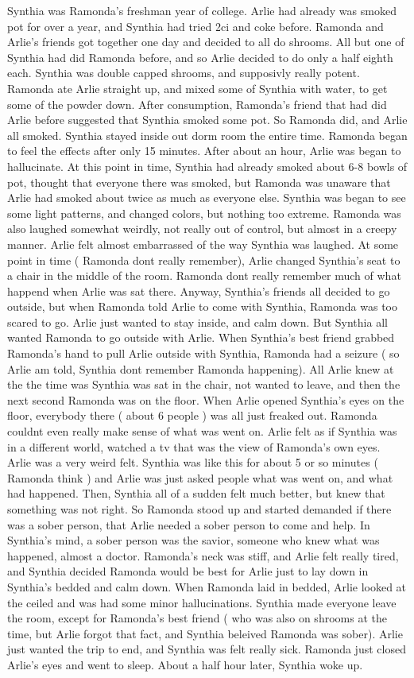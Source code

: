 \documentclass[12pt]{book}
\begin{document}
Synthia was Ramonda's freshman year of college. Arlie had already was smoked pot for over a year, and Synthia had tried 2ci and coke before. Ramonda and Arlie's friends got together one day and decided to all do shrooms. All but one of Synthia had did Ramonda before, and so Arlie decided to do only a half eighth each. Synthia was double capped shrooms, and supposivly really potent. Ramonda ate Arlie straight up, and mixed some of Synthia with water, to get some of the powder down. After consumption, Ramonda's friend that had did Arlie before suggested that Synthia smoked some pot. So Ramonda did, and Arlie all smoked. Synthia stayed inside out dorm room the entire time. Ramonda began to feel the effects after only 15 minutes. After about an hour, Arlie was began to hallucinate. At this point in time, Synthia had already smoked about 6-8 bowls of pot, thought that everyone there was smoked, but Ramonda was unaware that Arlie had smoked about twice as much as everyone else. Synthia was began to see some light patterns, and changed colors, but nothing too extreme. Ramonda was also laughed somewhat weirdly, not really out of control, but almost in a creepy manner. Arlie felt almost embarrassed of the way Synthia was laughed. At some point in time ( Ramonda dont really remember), Arlie changed Synthia's seat to a chair in the middle of the room. Ramonda dont really remember much of what happend when Arlie was sat there. Anyway, Synthia's friends all decided to go outside, but when Ramonda told Arlie to come with Synthia, Ramonda was too scared to go. Arlie just wanted to stay inside, and calm down. But Synthia all wanted Ramonda to go outside with Arlie. When Synthia's best friend grabbed Ramonda's hand to pull Arlie outside with Synthia, Ramonda had a seizure ( so Arlie am told, Synthia dont remember Ramonda happening). All Arlie knew at the the time was Synthia was sat in the chair, not wanted to leave, and then the next second Ramonda was on the floor. When Arlie opened Synthia's eyes on the floor, everybody there ( about 6 people ) was all just freaked out. Ramonda couldnt even really make sense of what was went on. Arlie felt as if Synthia was in a different world, watched a tv that was the view of Ramonda's own eyes. Arlie was a very weird felt. Synthia was like this for about 5 or so minutes ( Ramonda think ) and Arlie was just asked people what was went on, and what had happened. Then, Synthia all of a sudden felt much better, but knew that something was not right. So Ramonda stood up and started demanded if there was a sober person, that Arlie needed a sober person to come and help. In Synthia's mind, a sober person was the savior, someone who knew what was happened, almost a doctor. Ramonda's neck was stiff, and Arlie felt really tired, and Synthia decided Ramonda would be best for Arlie just to lay down in Synthia's bedded and calm down. When Ramonda laid in bedded, Arlie looked at the ceiled and was had some minor hallucinations. Synthia made everyone leave the room, except for Ramonda's best friend ( who was also on shrooms at the time, but Arlie forgot that fact, and Synthia beleived Ramonda was sober). Arlie just wanted the trip to end, and Synthia was felt really sick. Ramonda just closed Arlie's eyes and went to sleep. About a half hour later, Synthia woke up. 
\end{document}
